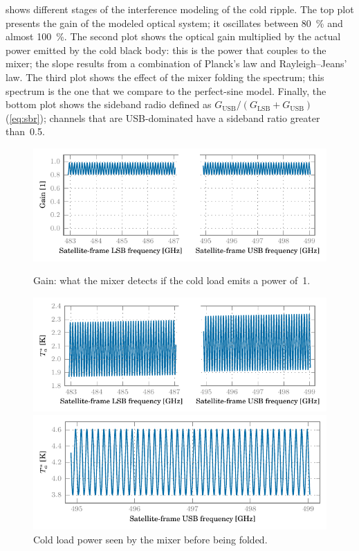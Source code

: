 shows different stages of the interference modeling of the cold ripple.
The top plot presents the gain of the modeled optical system;
it oscillates between \SI{80}{\percent} and almost \SI{100}{\percent}.
The second plot shows the optical gain multiplied by the actual power emitted by the cold black body: this is the power that couples to the mixer;
the slope results from a combination of Planck's law and Rayleigh--Jeans' law.
The third plot shows the effect of the mixer folding the spectrum;
this spectrum is the one that we compare to the perfect-sine model.
Finally, the bottom plot shows the sideband radio defined as $G_\text{USB}/(G_\text{LSB}+G_\text{USB})$ (\vref{eq:sbr});
channels that are USB-dominated have a sideband ratio greater than~\num{0.5}.

\begin{figure}
    \centering
    \includegraphics{mars_25_interf_dsb_gain_cold}
    \vspace{-1.1em}
    \caption*{Gain: what the mixer detects if the cold load emits a power of~1.}
    \medskip
    \includegraphics{mars_25_interf_dsb_temp_cold}
    \vspace{-1.1em}
    \caption*{Cold load power seen by the mixer before being folded.}
    \medskip
    \includegraphics{mars_25_interf_fld_temp_cold}

\end{figure}
